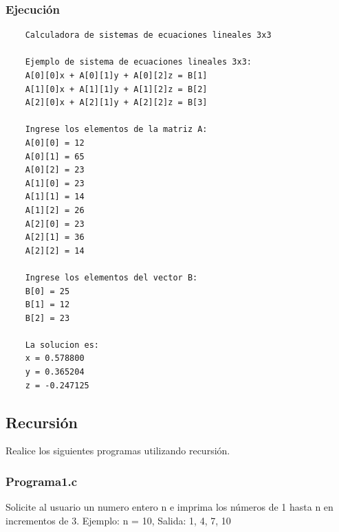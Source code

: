 \documentclass{article}
\begin{document}
	\subsubsection{Ejecución}
	
	\begin{lstlisting}
	Calculadora de sistemas de ecuaciones lineales 3x3
	
	Ejemplo de sistema de ecuaciones lineales 3x3:
	A[0][0]x + A[0][1]y + A[0][2]z = B[1]
	A[1][0]x + A[1][1]y + A[1][2]z = B[2]
	A[2][0]x + A[2][1]y + A[2][2]z = B[3]
	
	Ingrese los elementos de la matriz A: 
	A[0][0] = 12
	A[0][1] = 65
	A[0][2] = 23
	A[1][0] = 23
	A[1][1] = 14
	A[1][2] = 26
	A[2][0] = 23
	A[2][1] = 36
	A[2][2] = 14
	
	Ingrese los elementos del vector B:
	B[0] = 25
	B[1] = 12
	B[2] = 23
	
	La solucion es:
	x = 0.578800
	y = 0.365204
	z = -0.247125
	\end{lstlisting}
	
	\newpage
	
	\subsection{Recursión}
	
	Realice los siguientes programas utilizando recursión.
	
	\subsubsection{Programa1.c}
	
	Solicite al usuario un numero entero n e imprima los números de 1 hasta n en incrementos de 3. Ejemplo: n = 10, Salida: 1, 4, 7, 10
	
\end{document}
